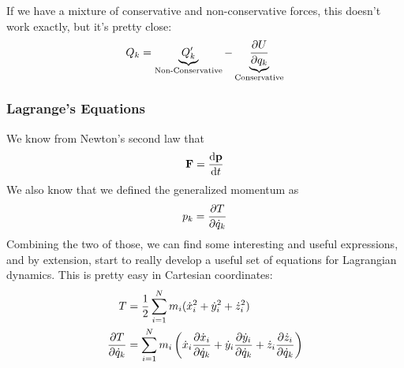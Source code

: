 \documentclass[a4paper]{article}
\begin{document}
If we have a mixture of conservative and non-conservative forces, this doesn't
work exactly, but it's pretty close:
\[ Q_k = \underbrace{Q'_k}_{\text{Non-Conservative}}
	-\underbrace{\frac{\partial U}{\partial q_k}}_{\text{Conservative}} \]

\subsubsection{Lagrange's Equations}
We know from Newton's second law that 
\[ \boldsymbol{\mathbf{F}} = \frac{\mathrm{d} \boldsymbol{\mathbf{p}}}{\mathrm{d} t} \]
We also know that we defined the generalized momentum as
\[ p_k = \frac{\partial T}{\partial \dot{q}_k} \]
Combining the two of those, we can find some interesting and useful
expressions,
and by extension, start to really develop a useful set of equations for
Lagrangian dynamics. This is pretty easy in Cartesian coordinates:
\begin{align*}
	T&=\frac{1}{2}\sum_{i=1}^{N}m_i(\dot{x}_i^2+\dot{y}_i^2+\dot{z}_i^2)\\
	\frac{\partial T}{\partial \dot{q}_k} &= \sum_{i=1}^{N}
		m_i\left(\dot{x}_i\frac{\partial \dot{x}_i}{\partial \dot{q}_k} +
			\dot{y}_i\frac{\partial \dot{y}_i}{\partial \dot{q}_k} +
			\dot{z}_i\frac{\partial \dot{z}_i}{\partial \dot{q}_k}\right)
\end{align*}
\end{document}

